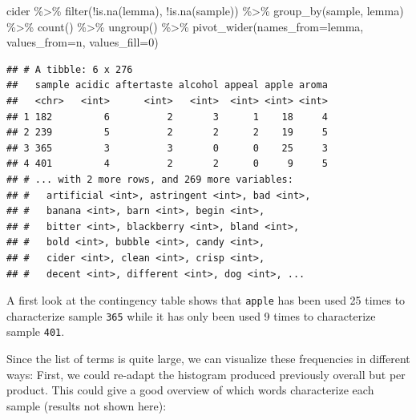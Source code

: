 \documentclass[
]{krantz}
\makeatletter
\newenvironment{Shaded}{\begin{snugshade}}{\end{snugshade}}
\newcommand{\AttributeTok}[1]{\textcolor[rgb]{0.61,0.61,0.61}{#1}}
\newcommand{\DecValTok}[1]{\textcolor[rgb]{0.06,0.06,0.06}{#1}}
\newcommand{\FunctionTok}[1]{\textcolor[rgb]{0,0,0}{#1}}
\newcommand{\NormalTok}[1]{#1}
\newcommand{\SpecialCharTok}[1]{\textcolor[rgb]{0,0,0}{#1}}
\newenvironment{kframe}{%
\medskip{}
\setlength{\fboxsep}{.8em}
 \def\at@end@of@kframe{}%
 \ifinner\ifhmode%
  \def\at@end@of@kframe{\end{minipage}}%
  \begin{minipage}{\columnwidth}%
 \fi\fi%
 \def\FrameCommand##1{\hskip\@totalleftmargin \hskip-\fboxsep
 \colorbox{shadecolor}{##1}\hskip-\fboxsep
     \hskip-\linewidth \hskip-\@totalleftmargin \hskip\columnwidth}%
 \MakeFramed {\advance\hsize-\width
   \@totalleftmargin\z@ \linewidth\hsize
   \@setminipage}}%
 {\par\unskip\endMakeFramed%
 \at@end@of@kframe}
\renewenvironment{Shaded}{\begin{kframe}}{\end{kframe}}
\makeatother
\begin{document}
\begin{Shaded}
\begin{Highlighting}[]
\NormalTok{cider }\SpecialCharTok{\%\textgreater{}\%} 
  \FunctionTok{filter}\NormalTok{(}\SpecialCharTok{!}\FunctionTok{is.na}\NormalTok{(lemma), }\SpecialCharTok{!}\FunctionTok{is.na}\NormalTok{(sample)) }\SpecialCharTok{\%\textgreater{}\%} 
  \FunctionTok{group\_by}\NormalTok{(sample, lemma) }\SpecialCharTok{\%\textgreater{}\%} 
  \FunctionTok{count}\NormalTok{() }\SpecialCharTok{\%\textgreater{}\%} 
  \FunctionTok{ungroup}\NormalTok{() }\SpecialCharTok{\%\textgreater{}\%} 
  \FunctionTok{pivot\_wider}\NormalTok{(}\AttributeTok{names\_from=}\NormalTok{lemma, }\AttributeTok{values\_from=}\NormalTok{n, }\AttributeTok{values\_fill=}\DecValTok{0}\NormalTok{)}
\end{Highlighting}
\end{Shaded}

\begin{verbatim}
## # A tibble: 6 x 276
##   sample acidic aftertaste alcohol appeal apple aroma
##   <chr>   <int>      <int>   <int>  <int> <int> <int>
## 1 182         6          2       3      1    18     4
## 2 239         5          2       2      2    19     5
## 3 365         3          3       0      0    25     3
## 4 401         4          2       2      0     9     5
## # ... with 2 more rows, and 269 more variables:
## #   artificial <int>, astringent <int>, bad <int>,
## #   banana <int>, barn <int>, begin <int>,
## #   bitter <int>, blackberry <int>, bland <int>,
## #   bold <int>, bubble <int>, candy <int>,
## #   cider <int>, clean <int>, crisp <int>,
## #   decent <int>, different <int>, dog <int>, ...
\end{verbatim}

A first look at the contingency table shows that \texttt{apple} has been used 25 times to characterize sample \texttt{365} while it has only been used 9 times to characterize sample \texttt{401}.

Since the list of terms is quite large, we can visualize these frequencies in different ways: First, we could re-adapt the histogram produced previously overall but per product. This could give a good overview of which words characterize each sample (results not shown here):
\end{document}

